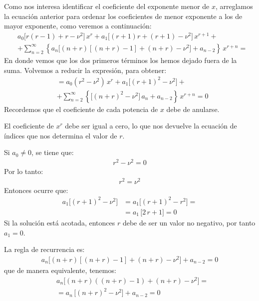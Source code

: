 Como nos interesa identificar el coeficiente del exponente menor de $x$, arreglamos la ecuación anterior para ordenar los coeficientes de menor exponente a los de mayor exponente, como veremos a continuación:
\begin{align*}
&a_{0} \bigg[ r (r - 1) + r - \nu^{2} \bigg] \, x^{r} + a_{1} \bigg[ (r + 1) r + (r + 1) - \nu^{2} \bigg] \, x^{r+1} + \\[0.5em]
&+ \sum_{n=2}^{\infty} \left\{ a_{n} \bigg[ (n + r) \left[ (n + r) - 1 \right] + (n + r) - \nu^{2} \bigg] + a_{n-2} \right\} \, x^{r+n} =
\end{align*}
En donde vemos que los dos primeros términos los hemos dejado fuera de la suma. Volvemos a reducir la expresión, para obtener:
\begin{align*}
&= a_{0} (r^{2} - \nu^{2}) \, x^{r} + a_{1} \bigg[ (r + 1)^{2} - \nu^{2} \bigg] + \\[0.5em]
&+ \sum_{n=2}^{\infty} \left\{ \bigg[ (n + r)^{2} - \nu^{2} \bigg] \, a_{n} + a_{n-2} \right\} \, x^{r+n} = 0
\end{align*}
Recordemos que el coeficiente de cada potencia de $x$ debe de anularse.
\par
El coeficiente de $x^{r}$ debe ser igual a cero, lo que nos devuelve la ecuación de índices que nos determina el valor de $r$.
\par
Si $a_{0} \neq 0$, se tiene que:
\begin{align*}
r^{2} - \nu^{2} = 0
\end{align*}
Por lo tanto:
\begin{align*}
r^{2} = \nu^{2}
\end{align*}
Entonces ocurre que:
\begin{align*}
a_{1} \big[ (r + 1)^{2} - \nu^{2} \big] &= a_{1} \big[ (r + 1)^{2} - r^{2} \big] = \\[0.5em]
&= a_{1} \, \big[ 2 \, r + 1 \big] = 0
\end{align*}
Si la solución está acotada, entonces $r$ debe de ser un valor no negativo, por tanto $a_{1} = 0$.
\par
La regla de recurrencia es:
\begin{align*}
a_{n} \big[ (n + r) \left[ (n + r) - 1 \right] + (n + r) - \nu^{2} \big] + a_{n-2} = 0
\end{align*}
que de manera equivalente, tenemos:
\begin{align*}
&a_{n} \big[ (n + r) \left( (n + r) - 1 \right) + (n + r) - \nu^{2} \big] = \\[0.5em]
&= a_{n} \, \big[ (n + r)^{2} - \nu^{2} \big] + a_{n-2} = 0
\end{align*}
